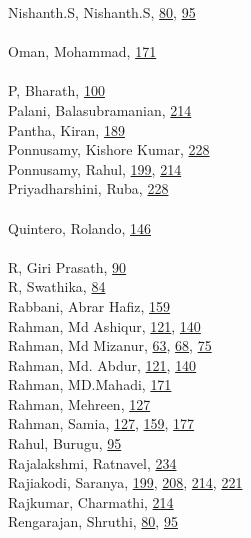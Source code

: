 \documentclass[11pt,oneside]{book}
\begin{document}
\begin{multicols}{2}
Nishanth.S, Nishanth.S, \hyperlink{page.80}{80}, \hyperlink{page.95}{95}\\
\\ %
Oman, Mohammad, \hyperlink{page.171}{171}\\
\\ %
P, Bharath, \hyperlink{page.100}{100}\\
Palani, Balasubramanian, \hyperlink{page.214}{214}\\
Pantha, Kiran, \hyperlink{page.189}{189}\\
Ponnusamy, Kishore Kumar, \hyperlink{page.228}{228}\\
Ponnusamy, Rahul, \hyperlink{page.199}{199}, \hyperlink{page.214}{214}\\
Priyadharshini, Ruba, \hyperlink{page.228}{228}\\
\\ %
Quintero, Rolando, \hyperlink{page.146}{146}\\
\\ %
R, Giri Prasath, \hyperlink{page.90}{90}\\
R, Swathika, \hyperlink{page.84}{84}\\
Rabbani, Abrar Hafiz, \hyperlink{page.159}{159}\\
Rahman, Md Ashiqur, \hyperlink{page.121}{121}, \hyperlink{page.140}{140}\\
Rahman, Md Mizanur, \hyperlink{page.63}{63}, \hyperlink{page.68}{68}, \hyperlink{page.75}{75}\\
Rahman, Md. Abdur, \hyperlink{page.121}{121}, \hyperlink{page.140}{140}\\
Rahman, MD.Mahadi, \hyperlink{page.171}{171}\\
Rahman, Mehreen, \hyperlink{page.127}{127}\\
Rahman, Samia, \hyperlink{page.127}{127}, \hyperlink{page.159}{159}, \hyperlink{page.177}{177}\\
Rahul, Burugu, \hyperlink{page.95}{95}\\
Rajalakshmi, Ratnavel, \hyperlink{page.234}{234}\\
Rajiakodi, Saranya, \hyperlink{page.199}{199}, \hyperlink{page.208}{208}, \hyperlink{page.214}{214}, \hyperlink{page.221}{221}\\
Rajkumar, Charmathi, \hyperlink{page.214}{214}\\
Rengarajan, Shruthi, \hyperlink{page.80}{80}, \hyperlink{page.95}{95}\\

\end{multicols}
\end{document}
